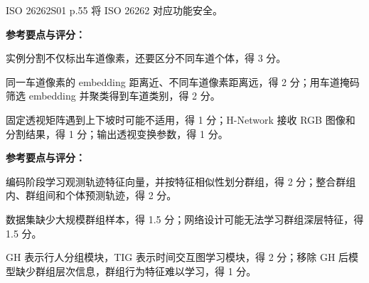 {ISO 26262}{S01 p.55 将 ISO 26262 对应功能安全。}

\exampagebreak
{}

{\textbf{参考要点与评分：}
\begin{subquestions}
\item 实例分割不仅标出车道像素，还要区分不同车道个体，得 3 分。
\item 同一车道像素的 embedding 距离近、不同车道像素距离远，得 2 分；用车道掩码筛选 embedding 并聚类得到车道类别，得 2 分。
\item 固定透视矩阵遇到上下坡时可能不适用，得 1 分；H-Network 接收 RGB 图像和分割结果，得 1 分；输出透视变换参数，得 1 分。
\end{subquestions}}

{\textbf{参考要点与评分：}
\begin{subquestions}
\item 编码阶段学习观测轨迹特征向量，并按特征相似性划分群组，得 2 分；整合群组内、群组间和个体预测轨迹，得 2 分。
\item 数据集缺少大规模群组样本，得 1.5 分；网络设计可能无法学习群组深层特征，得 1.5 分。
\item GH 表示行人分组模块，TIG 表示时间交互图学习模块，得 2 分；移除 GH 后模型缺少群组层次信息，群组行为特征难以学习，得 1 分。
\end{subquestions}}

